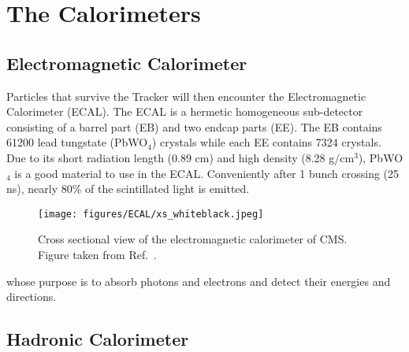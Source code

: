 \section{The Calorimeters}
\label{sec:calo}

\subsection{Electromagnetic Calorimeter}

Particles that survive the Tracker will then encounter the Electromagnetic Calorimeter (ECAL).
The ECAL is a hermetic homogeneous sub-detector consisting of a barrel part (EB) and two endcap parts (EE).
The EB contains 61200 lead tungstate (PbWO$_4$) crystals while each EE contains 7324 crystals.
Due to its short radiation length (0.89 cm) and high density (8.28 g/cm$^3$),
PbWO$_4$ is a good material to use in the ECAL.
Conveniently after 1 bunch crossing (25 ns), nearly 80\% of the scintillated light is emitted.

\begin{figure*}[!htb]
    \centering
    \captionsetup{justification=justified}
    \texttt{[image: figures/ECAL/xs\_whiteblack.jpeg]}
    \caption{Cross sectional view of the electromagnetic calorimeter of CMS.
             Figure taken from Ref.~\cite{jinst:cms_exp}.}
    \label{fig:ecal_xs}
\end{figure*}

whose purpose is to absorb photons and electrons and detect their energies and directions.

\subsection{Hadronic Calorimeter}

